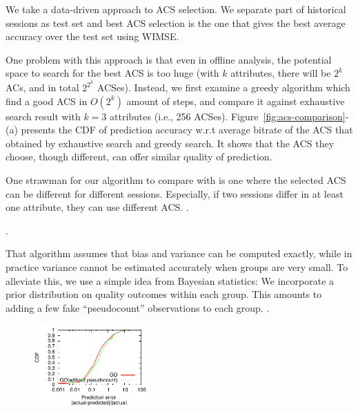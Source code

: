  We take a data-driven approach to ACS selection. We separate part of historical sessions as test set and best ACS selection is the one that gives the best average accuracy over the test set using WIMSE. 

 One problem with this approach is that even in offline analysis, the potential space to search for the best ACS is too huge (with $k$ attributes, there will be $2^k$ ACs, and in total $2^{2^k}$ ACSes). Instead, we first examine a greedy algorithm which find a good ACS in $O(2^k)$ amount of steps, and compare it against exhaustive search result with $k=3$ attributes (i.e., 256 ACSes). Figure~\ref{fig:acs-comparison}-(a) presents the CDF of prediction accuracy w.r.t average bitrate of the ACS that obtained by exhaustive search and greedy search. It shows that the ACS they choose, though different, can offer similar quality of prediction.


 One strawman for our algorithm to compare with is one where the selected ACS can be different for different sessions. Especially, if two sessions differ in at least one attribute, they can use different ACS. \fillme. 

 \fillme. 

That algorithm assumes that bias and variance can be computed exactly, while in practice variance cannot be estimated accurately when groups are very small.  To alleviate this, we use a simple idea from Bayesian statistics: We incorporate a prior distribution on quality outcomes within each group.  This amounts to adding a few fake ``pseudocount'' observations to each group.  \fillme.


\begin{figure}[h!]
\centering
 \includegraphics[width=0.4\textwidth] {figures/prediction-comparisons/example-pcount-metric1.pdf}
\label{fig:quality-variability}
\end{figure}

